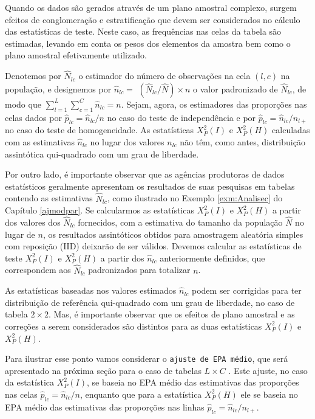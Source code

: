 \documentclass[]{book}
\theoremstyle{definition}
\theoremstyle{definition}
\theoremstyle{definition}
\theoremstyle{remark}
\begin{document}
Quando os dados são gerados através de um plano amostral complexo,
surgem efeitos de conglomeração e estratificação que devem ser
considerados no cálculo das estatísticas de teste. Neste caso, as
frequências nas celas da tabela são estimadas, levando em conta os pesos
dos elementos da amostra bem como o plano amostral efetivamente
utilizado.

Denotemos por \(\hat{N}_{lc}\) o estimador do número de observações na
cela \(\left( l,c\right)\) na população, e designemos por
\(\hat{n}_{lc}=\) \(\left( \hat{N}_{lc}/\hat{N}\right) \times n\) o
valor padronizado de \(\hat{N}_{lc}\), de modo que
\(\sum\limits_{l=1}^{L}\sum\limits_{c=1}^{C}\hat{n}_{lc}=n\). Sejam,
agora, os estimadores das proporções nas celas dados por
\(\hat{p}_{lc}=\hat{n}_{lc}/n\) no caso do teste de independência e por
\(\hat{p}_{lc}=\hat{n}_{lc}/n_{l+}\) no caso do teste de homogeneidade.
As estatísticas \(X_{P}^{2}\left( I\right)\) e
\(X_{P}^{2}\left(H\right)\) calculadas com as estimativas
\(\hat{n}_{lc}\) no lugar dos valores \(n_{lc}\) não têm, como antes,
distribuição assintótica qui-quadrado com um grau de liberdade.

Por outro lado, é importante observar que as agências produtoras de
dados estatísticos geralmente apresentam os resultados de suas pesquisas
em tabelas contendo as estimativas \(\hat{N}_{lc}\), como ilustrado no
Exemplo \ref{exm:Analisec} do Capítulo \ref{ajmodpar}. Se calcularmos as
estatísticas \(X_{P}^{2}\left( I\right)\) e \(X_{P}^{2}\left( H\right)\)
a partir dos valores dos \(\hat{N}_{lc}\) fornecidos, com a estimativa
do tamanho da população \(\hat{N}\) no lugar de \(n\), os resultados
assintóticos obtidos para amostragem aleatória simples com reposição
(IID) deixarão de ser válidos. Devemos calcular as estatísticas de teste
\(X_{P}^{2}\left( I\right)\) e \(X_{P}^{2}\left( H\right)\) a partir dos
\(\hat{n}_{lc}\) anteriormente definidos, que correspondem aos
\(\hat{N}_{lc}\) padronizados para totalizar \(n\).

As estatísticas baseadas nos valores estimados \(\hat{n}_{lc}\) podem
ser corrigidas para ter distribuição de referência qui-quadrado com um
grau de liberdade, no caso de tabela \(2\times 2\). Mas, é importante
observar que os efeitos de plano amostral e as correções a serem
considerados são distintos para as duas estatísticas
\(X_{P}^{2}\left( I\right)\) e \(X_{P}^{2}\left(H\right)\).

Para ilustrar esse ponto vamos considerar o
\texttt{ajuste\ de\ EPA\ médio}, que será apresentado na próxima seção
para o caso de tabelas \(L\times C\) . Este ajuste, no caso da
estatística \(X_{P}^{2}\left( I\right)\), se baseia no EPA médio das
estimativas das proporções nas celas \(\hat{p}_{lc}=\hat{n}_{lc}/n\),
enquanto que para a estatística \(X_{P}^{2}\left( H\right)\) ele se
baseia no EPA médio das estimativas das proporções nas linhas
\(\hat{p}_{lc}=\hat{n} _{lc}/n_{l+}\).
\end{document}
